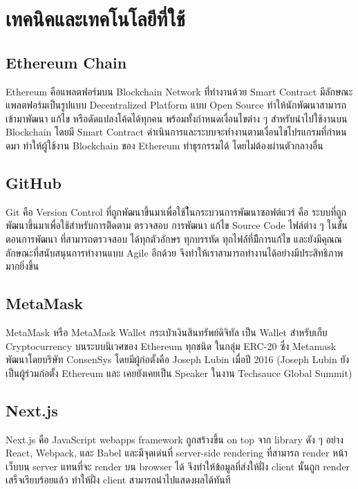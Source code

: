\documentclass[12pt,oneside,openright,a4paper]{cpe-thai-project}
\begin{document}
\clearpage

\section{เทคนิคและเทคโนโลยีที่ใช้}

\subsection{Ethereum Chain  \cite{eth}} 
\tab Ethereum คือแพลตฟอร์มบน Blockchain Network ที่่ทํางานด้วย Smart Contract มีลักษณะแพลตฟอร์มเป็นรูปแบบ Decentralized Platform แบบ Open Source ทําให้นักพัฒนาสามารถเข้ามาพัฒนา แก้ไข หรือดัดแปลงโค้ดได้ทุกคน พร้อมทั้งกําหนดเงื่อนไขต่าง ๆ สําหรับนําไปใช้งานบน Blockchain โดยมี Smart Contract ดําเนินการและระบบจะทํางานตามเงื่อนไขโปรแกรมที่กําหนดมา ทําให้ผู้ใช้งาน Blockchain ของ Ethereum ทําธุรกรรมได้ โดยไม่ต้องผ่านตัวกลางอื่น

\subsection{GitHub  \cite{github}}
\tab Git คือ Version Control ที่ถูกพัฒนาขึ้นมาเพื่อใช้ใ้นกระบวนการพัฒนาซอฟต์แวร์ คือ ระบบที่ถูกพัฒนาขึ้นมาเพื่อใช้สำหรับการติิดตาม ตรวจสอบ การพัฒนา แก้ไข Source Code ไฟล์ต่าง ๆ ในขั้นตอนการพัฒนา ที่สามารถตรวจสอบ ได้ทุกตัวอักษร ทุกบรรทัด ทุกไฟล์์ที่มีีการแก้ไข และยังมีคุณณลักษณะที่สนับสนุนการทำงานแบบ Agile อีกด้วย จึงทำให้เราสามารถทำงานได้อย่างมีประสิทธิภาพมากยิ่งขึ้น

\subsection{MetaMask \cite{metamask}}
\tab MetaMask หรือ MetaMask Wallet กระเป๋าเงินสินทรัพย์ดิจิทัล เป็น Wallet สำหรับเก็บ Cryptocurrency บนระบบนิเวศของ Ethereum ทุกชนิด ในกลุ่ม ERC-20 ซึ่ง Metamask พัฒนาโดยบริษัท ConsenSys โดยมีผู้ก่อตั้งคือ Joseph Lubin เมื่อปี 2016 (Joseph Lubin ยังเป็นผู้ร่วมก่อตั้ง Ethereum และ เคยยังเคยเป็น Speaker ในงาน Techsauce Global Summit)

\subsection{Next.js \cite{nextjs}}
\tab Next.js คือ JavaScript webapps framework ถูกสร้างขึ้น on top จาก library ดัง ๆ อย่าง React, Webpack, และ Babel และมีจุดเด่นที่ server-side rendering ที่สามารถ render หน้าเว็บบน server แทนที่จะ render บน browser ได้ จึงทำให้ข้อมูลที่ส่งให้ฝั่ง client นั้นถูก render เสร็จเรียบร้อยแล้ว ทำให้ฝั่ง client สามารถนำไปแสดงผลได้ทันที
\end{document}

